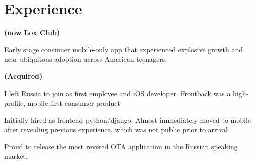\documentclass[]{plushcv}
\begin{document}







\begin{minipage}[t]{0.70\textwidth} 



\section{Experience}
\vspace{\topsep} 
\sectionsep
\sectionsep

 \textbf{(now Lox Club)}
\vspace{\topsep}
\begin{tightemize}
\sectionsep
\item Early stage consumer mobile-only app that experienced explosive growth and near ubiquitous adoption across American teenagers.
\end{tightemize}
\sectionsep

 \textbf{(Acquired)}
\begin{tightemize}
\item I left Russia to join as first employee and iOS developer. Frontback was a high-profile, mobile-first consumer product 
\end{tightemize}
\sectionsep

\begin{tightemize}
\item Initially hired as frontend python/django. Almost immediately moved to mobile after revealing previous experience,  which was not public prior to arrival
\item Proud to release the most revered OTA application in the Russian speaking market.


\end{tightemize}
\end{minipage}
\end{document}
